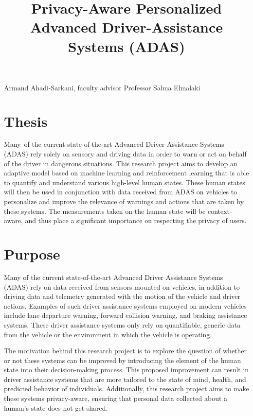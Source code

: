 \documentclass[12pt]{article}
\title{Privacy-Aware Personalized Advanced Driver-Assistance Systems (ADAS)\vspace{-3em}}
\date{}
\renewcommand{\_}{\kern-1.5pt\textunderscore\kern-1.5pt}
\begin{document}
\maketitle
\begin{Center}
Armand Ahadi-Sarkani, faculty advisor Professor Salma Elmalaki 
\end{Center}\par

\section{Thesis}
Many\ of the current state-of-the-art Advanced Driver Assistance Systems (ADAS) rely solely on sensory and driving data in order to warn or act on behalf of the driver in dangerous situations.  This research project aims to develop an adaptive model based on machine learning and reinforcement learning that is able to quantify and understand various high-level human states. These human states will then be used in conjunction with data received from ADAS on vehicles to personalize and improve the relevance of warnings and actions that are taken by these systems. The measurements taken on the human state will be context-aware, and thus place a significant importance on respecting the privacy of users.\par

\section{Purpose}
Many of the current state-of-the-art Advanced Driver Assistance Systems (ADAS) rely on data received from sensors mounted on vehicles, in addition to driving data and telemetry generated with the motion of the vehicle and driver actions. Examples of such driver assistance systems employed on modern vehicles include lane departure warning, forward collision warning, and braking assistance systems. These driver assistance systems only rely on quantifiable, generic data from the vehicle or the environment in which the vehicle is operating. \par

\vspace{\baselineskip}
The motivation behind this research project is to explore the question of whether or not these systems can be improved by introducing the element of the human state into their decision-making process. This proposed improvement can result in driver assistance systems that are more tailored to the state of mind, health, and predicted behavior of individuals. Additionally, this research project aims to make these systems privacy-aware, ensuring that personal data collected about a human’s state does not get shared.\par
\end{document}
